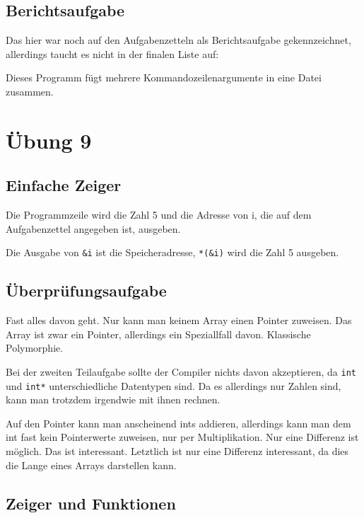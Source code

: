 \section{Berichtsaufgabe}

Das hier war noch auf den Aufgabenzetteln als Berichtsaufgabe gekennzeichnet, allerdings taucht es nicht in der finalen Liste auf:

Dieses Programm fügt mehrere Kommandozeilenargumente in eine Datei zusammen.


\chapter{Übung 9}

\section{Einfache Zeiger}

Die Programmzeile wird die Zahl 5 und die Adresse von i, die auf dem Aufgabenzettel angegeben ist, ausgeben.

Die Ausgabe von \verb#&i# ist die Speicheradresse, \verb#*(&i)# wird die Zahl 5 ausgeben.

\section{Überprüfungsaufgabe}

Fast alles davon geht. Nur kann man keinem Array einen Pointer zuweisen. Das Array ist zwar ein Pointer, allerdings ein Speziallfall davon. Klassische Polymorphie.

Bei der zweiten Teilaufgabe sollte der Compiler nichts davon akzeptieren, da \texttt{int} und \texttt{int*} unterschiedliche Datentypen sind. Da es allerdings nur Zahlen sind, kann man trotzdem irgendwie mit ihnen rechnen.

Auf den Pointer kann man anscheinend ints addieren, allerdings kann man dem int fast kein Pointerwerte zuweisen, nur per Multiplikation. Nur eine Differenz ist möglich. Das ist interessant. Letztlich ist nur eine Differenz interessant, da dies die Lange eines Arrays darstellen kann.

\section{Zeiger und Funktionen}

